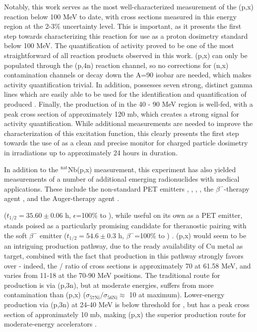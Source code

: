 \documentclass[3p]{elsarticle}
\begin{document}
Notably, this work serves as the most well-characterized measurement of the (p,x) reaction below 100 MeV to date, with cross sections measured in this energy region at the 2-3\% uncertainty level.
This is important, as it presents the first step towards characterizing this reaction for use as a proton dosimetry standard below 100 MeV.
The quantification of  activity proved to be one of the most straightforward of all reaction products observed in this work.
(p,x) can only be populated through the (p,4n) reaction channel, so no corrections for (n,x) contamination channels or decay down the A=90 isobar are needed, which makes activity quantification trivial.
In addition,   possesses seven strong, distinct gamma lines which are easily able to be used for the identification and quantification of produced .
Finally, the production of   in the 40 - 90 MeV region is well-fed, with a peak cross section of approximately 120 mb, which creates a strong signal for activity quantification.
While additional measurements are needed to improve the characterization of this excitation function, this clearly presents the first step towards the use of  as a clean and precise monitor for charged particle dosimetry in irradiations up to approximately 24 hours in duration.





In addition to the $^\text{nat}$Nb(p,x) measurement, this experiment has also yielded measurements of  a number of additional  emerging radionuclides with medical applications.
These include the non-standard PET emitters ,  , ,  , the $\beta^-$-therapy agent  ,  and the Auger-therapy agent . 



 ($t_{1/2}=35.60\pm0.06$ h, $\epsilon$=100\% to  \cite{Bhat1998}), while useful on its own as a PET emitter, stands poised as a particularly promising candidate for theranostic pairing with the soft $\beta^-$ emitter  ($t_{1/2}=54.6\pm0.3$ h, $\beta^-$=100\% to  \cite{Browne2010a}) \cite{PMID:7632762,zweit1996medium,Graves2016,Rosch2014}. 
(p,x) would seem to be an intriguing production pathway, due to the ready availability of Cu metal as target, combined with the fact that production in this pathway strongly favors  over  - indeed, the / ratio of cross sections is approximately 70 at 61.58 MeV, and varies from 11-18 at the 70-90 MeV positions.
The traditional route for  production is via (p,3n), but at moderate energies, suffers from more   contamination than (p,x)  ($\sigma_\text{57Ni} / \sigma_\text{56Ni}\approx$ 10 at maximum).
Lower-energy production via (p,3n) at 24-40 MeV is below threshold for , but has a peak cross section of approximately 10 mb, making (p,x) the superior production route for moderate-energy accelerators  \cite{MICHEL1997153,Ditrói2013}.
\end{document}
